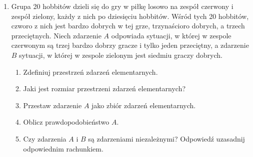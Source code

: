\documentclass[twoside]{mwart}
\begin{document}
\begin{enumerate}
\item Grupa 20 hobbitów dzieli się do gry w piłkę losowo na zespół czerwony i zespół zielony, każdy z nich po dziesięciu hobbitów.
Wśród tych 20 hobbitów, czworo z nich jest bardzo dobrych w tej grze, trzynaścioro dobrych, a trzech przeciętnych.
Niech zdarzenie $A$ odpowiada sytuacji, w której w zespole czerwonym są trzej bardzo dobrzy gracze i tylko jeden przeciętny, a zdarzenie $B$ sytuacji, w której w zespole zielonym jest siedmiu graczy dobrych.
\begin{enumerate}
\item Zdefiniuj przestrzeń zdarzeń elementarnych.
\item Jaki jest rozmiar przestrzeni zdarzeń elementarnych?
\item Przestaw zdarzenie $A$ jako zbiór zdarzeń elementarnych.
\item Oblicz prawdopodobieństwo $A$.
\item Czy zdarzenia $A$ i $B$ są zdarzeniami niezależnymi? Odpowiedź uzasadnij odpowiednim rachunkiem.
\end{enumerate}
\end{enumerate}

\clearpage
\end{document}

